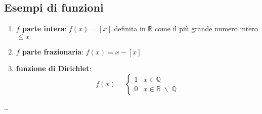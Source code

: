 \documentclass[a4paper]{article}
\newcommand\dom{\text{dom}}
\newcommand\Img{\text{Im}}
\begin{document}

\subsection{Esempi di funzioni}
\begin{enumerate}
	\item \textbf{\(f\) parte intera}: \(f(x) = \left[ x \right]\) definita in \(\mathbb{R}\) come il più grande numero intero \(\leq x\)
	\item \textbf{\(f\) parte frazionaria}: \(f(x) = x- \left[ x \right]\)
	\item \textbf{funzione di Dirichlet}: \[f(x) = \begin{cases}
			1 & x \in \mathbb{Q} \\
			0 & x \in \mathbb{R} \; \backslash \; \mathbb{Q}
		\end{cases}\]
\end{enumerate}
\dots

\end{document}
